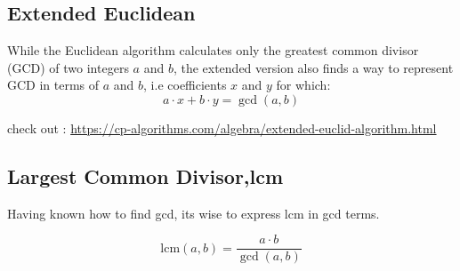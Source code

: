 \subsection{Extended Euclidean}
While the Euclidean algorithm calculates only the greatest common divisor (GCD) of two integers $a$ and $b$, the extended version also finds a way to represent GCD in terms of $a$ and $b$, i.e coefficients $x$ and $y$ for which: $$a \cdot x + b \cdot y = \gcd(a, b)$$

check out : \href{https://cp-algorithms.com/algebra/extended-euclid-algorithm.html}{https://cp-algorithms.com/algebra/extended-euclid-algorithm.html}

\subsection{Largest Common Divisor,lcm}
Having known how to find gcd, its wise to express lcm in gcd terms.

$$ \text{lcm}(a, b) = \frac{a \cdot b}{\gcd(a, b)} $$